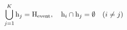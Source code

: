 \begin{equation}
    \bigcup_{j=1}^{K} \mathrm{h}_j = \mathrm{H}_{\mathrm{event}}, \quad \mathrm{h}_i \cap \mathrm{h}_j = \emptyset \quad (i \neq j)
\end{equation}


